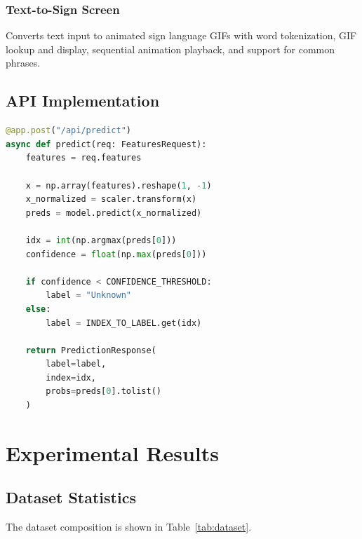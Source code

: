 \documentclass[conference]{IEEEtran}
\begin{document}
\subsubsection{Text-to-Sign Screen}

Converts text input to animated sign language GIFs with word tokenization, GIF lookup and display, sequential animation playback, and support for common phrases.

\subsection{API Implementation}

\begin{lstlisting}[language=Python, caption={Sign Classification Endpoint}]
@app.post("/api/predict")
async def predict(req: FeaturesRequest):
    features = req.features
    
    x = np.array(features).reshape(1, -1)
    x_normalized = scaler.transform(x)
    preds = model.predict(x_normalized)
    
    idx = int(np.argmax(preds[0]))
    confidence = float(np.max(preds[0]))
    
    if confidence < CONFIDENCE_THRESHOLD:
        label = "Unknown"
    else:
        label = INDEX_TO_LABEL.get(idx)
    
    return PredictionResponse(
        label=label,
        index=idx,
        probs=preds[0].tolist()
    )
\end{lstlisting}

\section{Experimental Results}

\subsection{Dataset Statistics}

The dataset composition is shown in Table~\ref{tab:dataset}.
\end{document}
